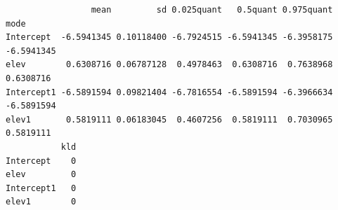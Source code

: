 \documentclass[
  letterpaper,
  DIV=11,
  numbers=noendperiod]{scrartcl}
\newenvironment{Shaded}{\begin{snugshade}}{\end{snugshade}}
\newcommand{\CommentTok}[1]{\textcolor[rgb]{0.37,0.37,0.37}{#1}}
\newcommand{\FunctionTok}[1]{\textcolor[rgb]{0.28,0.35,0.67}{#1}}
\newcommand{\NormalTok}[1]{\textcolor[rgb]{0.00,0.23,0.31}{#1}}
\newcommand{\OtherTok}[1]{\textcolor[rgb]{0.00,0.23,0.31}{#1}}
\newcommand{\SpecialCharTok}[1]{\textcolor[rgb]{0.37,0.37,0.37}{#1}}
\begin{document}
\begin{tcolorbox}
\begin{Shaded}
\end{Shaded}

\begin{verbatim}
                 mean         sd 0.025quant   0.5quant 0.975quant       mode
Intercept  -6.5941345 0.10118400 -6.7924515 -6.5941345 -6.3958175 -6.5941345
elev        0.6308716 0.06787128  0.4978463  0.6308716  0.7638968  0.6308716
Intercept1 -6.5891594 0.09821404 -6.7816554 -6.5891594 -6.3966634 -6.5891594
elev1       0.5819111 0.06183045  0.4607256  0.5819111  0.7030965  0.5819111
           kld
Intercept    0
elev         0
Intercept1   0
elev1        0
\end{verbatim}

\end{tcolorbox}
\end{document}
